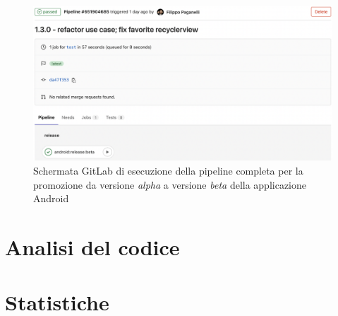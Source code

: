 \begin{figure}[H]
\centering
    \includegraphics[width=1\textwidth]{img/gitlab-pipeline-android-beta.png}
    \caption{Schermata GitLab di esecuzione della pipeline completa per la promozione da versione \textit{alpha} a versione \textit{beta} della applicazione Android}
    \label{gitlab-pipeline-android-beta}
\end{figure}

\section{Analisi del codice}

\section{Statistiche}

